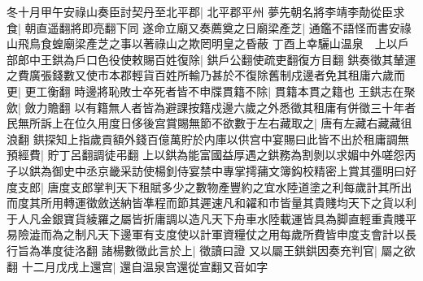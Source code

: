 冬十月甲午安祿山奏臣討契丹至北平郡|{
	北平郡平州}
夢先朝名將李靖李勣從臣求食|{
	朝直遥翻將即亮翻下同}
遂命立廟又奏薦奠之日廟梁產芝|{
	通鑑不語怪而書安祿山飛鳥食蝗廟梁產芝之事以著祿山之欺罔明皇之昏蔽}
丁酉上幸驪山温泉　上以戶部郎中王鉷為戶口色役使敕賜百姓復除|{
	鉷戶公翻使疏吏翻復方目翻}
鉷奏徵其輦運之費廣張錢數又使市本郡輕貨百姓所輸乃甚於不復除舊制戍邊者免其租庸六歲而更|{
	更工衡翻}
時邊將恥敗士卒死者皆不申牒貫籍不除|{
	貫籍本貫之籍也}
王鉷志在聚歛|{
	斂力贍翻}
以有籍無人者皆為避課按籍戍邊六歲之外悉徵其租庸有併徵三十年者民無所訴上在位久用度日侈後宫賞賜無節不欲數于左右藏取之|{
	唐有左藏右藏藏徂浪翻}
鉷探知上指歲貢額外錢百億萬貯於内庫以供宫中宴賜曰此皆不出於租庸調無預經費|{
	貯丁呂翻調徒弔翻}
上以鉷為能富國益厚遇之鉷務為割剝以求媚中外嗟怨丙子以鉷為御史中丞京畿采訪使楊釗侍宴禁中專掌摴蒱文簿鈎校精密上賞其彊明曰好度支郎|{
	唐度支郎掌判天下租賦多少之數物產豐約之宜水陸道塗之利每歲計其所出而度其所用轉運徵斂送納皆凖程而節其遲速凡和糴和市皆量其貴賤均天下之貨以利于人凡金銀寶貨綾羅之屬皆折庸調以造凡天下舟車水陸載運皆具為脚直輕重貴賤平易險澁而為之制凡天下邊軍有支度使以計軍資糧仗之用每歲所費皆申度支會計以長行旨為凖度徒洛翻}
諸楊數徵此言於上|{
	徵讀曰證}
又以屬王鉷鉷因奏充判官|{
	屬之欲翻}
十二月戊戌上還宫|{
	還自温泉宫還從宣翻又音如字}


